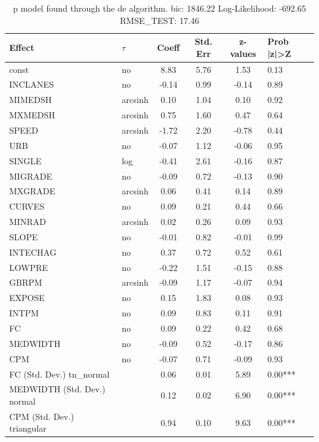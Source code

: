 \begin{table}
	\caption{p model found through the de algorithm. bic: 1846.22 Log-Likelihood: -692.65 RMSE_TEST: 17.46}
	\begin{center}
		\begin{tabular}{|l|l|c|c|c|l|}
			\hline
			Effect & $\tau$ & Coeff & Std. Err & z-values & Prob |z|>Z \\
			\hline
			const & no & 8.83 & 5.76 & 1.53 & 0.13 \\
			\hline
			INCLANES & no & -0.14 & 0.99 & -0.14 & 0.89 \\
			\hline
			MIMEDSH & arcsinh & 0.10 & 1.04 & 0.10 & 0.92 \\
			\hline
			MXMEDSH & arcsinh & 0.75 & 1.60 & 0.47 & 0.64 \\
			\hline
			SPEED & arcsinh & -1.72 & 2.20 & -0.78 & 0.44 \\
			\hline
			URB & no & -0.07 & 1.12 & -0.06 & 0.95 \\
			\hline
			SINGLE & log & -0.41 & 2.61 & -0.16 & 0.87 \\
			\hline
			MIGRADE & no & -0.09 & 0.72 & -0.13 & 0.90 \\
			\hline
			MXGRADE & arcsinh & 0.06 & 0.41 & 0.14 & 0.89 \\
			\hline
			CURVES & no & 0.09 & 0.21 & 0.44 & 0.66 \\
			\hline
			MINRAD & arcsinh & 0.02 & 0.26 & 0.09 & 0.93 \\
			\hline
			SLOPE & no & -0.01 & 0.82 & -0.01 & 0.99 \\
			\hline
			INTECHAG & no & 0.37 & 0.72 & 0.52 & 0.61 \\
			\hline
			LOWPRE & no & -0.22 & 1.51 & -0.15 & 0.88 \\
			\hline
			GBRPM & arcsinh & -0.09 & 1.17 & -0.07 & 0.94 \\
			\hline
			EXPOSE & no & 0.15 & 1.83 & 0.08 & 0.93 \\
			\hline
			INTPM & no & 0.09 & 0.83 & 0.11 & 0.91 \\
			\hline
			FC & no & 0.09 & 0.22 & 0.42 & 0.68 \\
			\hline
			MEDWIDTH & no & -0.09 & 0.52 & -0.17 & 0.86 \\
			\hline
			CPM & no & -0.07 & 0.71 & -0.09 & 0.93 \\
			\hline
			FC (Std. Dev.) tn_normal &  & 0.06 & 0.01 & 5.89 & 0.00*** \\
			\hline
			MEDWIDTH (Std. Dev.) normal &  & 0.12 & 0.02 & 6.90 & 0.00*** \\
			\hline
			CPM (Std. Dev.) triangular &  & 0.94 & 0.10 & 9.63 & 0.00*** \\
			\hline
		\end{tabular}
	\end{center}
\end{table}